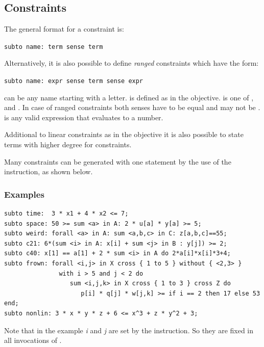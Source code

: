 \subsection{Constraints}\label{ssec:ug:constraints}
The general format for a constraint is:

\smallskip
\verb|subto name: term sense term|

\smallskip
\noindent Alternatively, it is also possible to define \emph{ranged} constraints
which have the form:

\smallskip
\verb|subto name: expr sense term sense expr|

\smallskip
\noindent {} can be any name starting with a letter.  is defined
as in the objective.  is one of
\code{<=}, \code{>=} and \code{==}. In case of ranged constraints
both senses have to be equal and may not be \code{==}.  is any
valid expression that evaluates to a number.

Additional to linear constraints as in the objective it is also
possible to state terms with higher degree for constraints.

Many constraints can be generated with one statement by the use of the
 instruction, as shown below.

\subsubsection{Examples}
{\small
\begin{verbatim}
subto time:  3 * x1 + 4 * x2 <= 7;
subto space: 50 >= sum <a> in A: 2 * u[a] * y[a] >= 5;
subto weird: forall <a> in A: sum <a,b,c> in C: z[a,b,c]==55;
subto c21: 6*(sum <i> in A: x[i] + sum <j> in B : y[j]) >= 2;
subto c40: x[1] == a[1] + 2 * sum <i> in A do 2*a[i]*x[i]*3+4;
subto frown: forall <i,j> in X cross { 1 to 5 } without { <2,3> }
               with i > 5 and j < 2 do
                  sum <i,j,k> in X cross { 1 to 3 } cross Z do
                     p[i] * q[j] * w[j,k] >= if i == 2 then 17 else 53 end;
subto nonlin: 3 * x * y * z + 6 <= x^3 + z * y^2 + 3;
\end{verbatim}
}
\noindent Note that in the example \emph{i} and \emph{j} are set by the 
instruction. So they are fixed in all invocations of .


